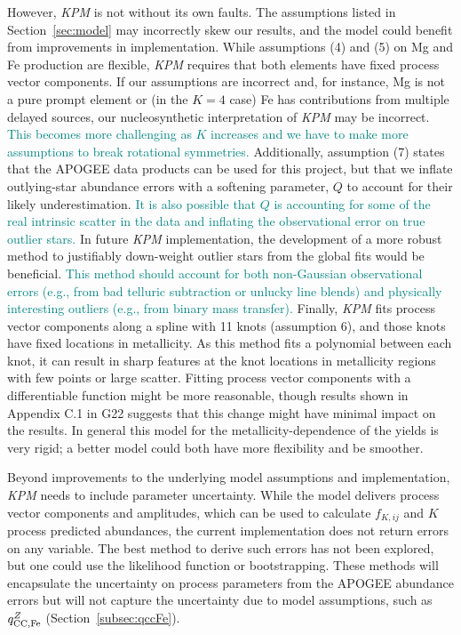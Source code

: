 \documentclass[modern]{aastex631}
\newcommand{\qccFe}{q_{{\rm CC, Fe}}^{Z}}
\newcommand{\add}[1]{\textcolor{teal}{#1}}
\newcommand{\name}{\textsl{KPM}}
\begin{document}
However, \name{} is not without its own faults. The assumptions listed in Section~\ref{sec:model} may incorrectly skew our results, and the model could benefit from improvements in implementation. While assumptions (4) and (5) on Mg and Fe production are flexible, \name{} requires that both elements have fixed process vector components. If our assumptions are incorrect and, for instance, Mg is not a pure prompt element or (in the $K=4$ case) Fe has contributions from multiple delayed sources, our nucleosynthetic interpretation of \name{} may be incorrect. \add{This becomes more challenging as $K$ increases and we have to make more assumptions to break rotational symmetries.} Additionally, assumption (7) states that the APOGEE data products can be used for this project, but that we inflate outlying-star abundance errors with a softening parameter, $Q$ to account for their likely underestimation. \add{It is also possible that $Q$ is accounting for some of the real intrinsic scatter in the data and inflating the observational error on true outlier stars.} In future \name{} implementation, the development of a more robust method to justifiably down-weight outlier stars from the global fits would be beneficial. \add{This method should account for both non-Gaussian observational errors (e.g., from bad telluric subtraction or unlucky line blends) and physically interesting outliers (e.g., from binary mass transfer).}
Finally, \name{} fits process vector components along a spline with 11 knots (assumption 6), and those knots have fixed locations in metallicity.
As this method fits a polynomial between each knot, it can result in sharp features at the knot locations in metallicity regions with few points or large scatter. Fitting process vector components with a differentiable function might be more reasonable, though results shown in Appendix C.1 in G22 suggests that this change might have minimal impact on the results. 
In general this model for the metallicity-dependence of the yields is very rigid; a better model could both have more flexibility and be smoother.

Beyond improvements to the underlying model assumptions and implementation, \name{} needs to include parameter uncertainty. While the model delivers process vector components and amplitudes, which can be used to calculate $f_{K, ij}$ and $K$ process predicted abundances, the current implementation does not return errors on any variable. The best method to derive such errors has not been explored, but one could use the likelihood function or bootstrapping. These methods will encapsulate the uncertainty on process parameters from the APOGEE abundance errors but will not capture the uncertainty due to model assumptions, such as $\qccFe$ (Section~\ref{subsec:qccFe}). 
\end{document}
